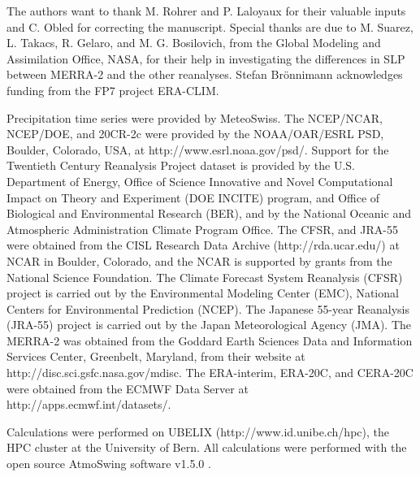 \documentclass[smallextended]{svjour3}       %
\begin{document}
	\begin{acknowledgements}
	The authors want to thank M. Rohrer and P. Laloyaux for their valuable inputs and C. Obled for correcting the manuscript. Special thanks are due to M. Suarez, L. Takacs, R. Gelaro, and M. G. Bosilovich, from the Global Modeling and Assimilation Office, NASA, for their help in investigating the differences in SLP between MERRA-2 and the other reanalyses. Stefan Br\"{o}nnimann acknowledges funding from the FP7 project ERA-CLIM.
	
	Precipitation time series were provided by MeteoSwiss. The NCEP/NCAR, NCEP/DOE, and 20CR-2c were provided by the NOAA/OAR/ESRL PSD, Boulder, Colorado, USA, at http://www.esrl.noaa.gov/psd/. Support for the Twentieth Century Reanalysis Project dataset is provided by the U.S. Department of Energy, Office of Science Innovative and Novel Computational Impact on Theory and Experiment (DOE INCITE) program, and Office of Biological and Environmental Research (BER), and by the National Oceanic and Atmospheric Administration Climate Program Office. The CFSR, and JRA-55 were obtained from the CISL Research Data Archive (http://rda.ucar.edu/) at NCAR in Boulder, Colorado, and the NCAR is supported by grants from the National Science Foundation. The Climate Forecast System Reanalysis (CFSR) project is carried out by the Environmental Modeling Center (EMC), National Centers for Environmental Prediction (NCEP). The Japanese 55-year Reanalysis (JRA-55) project is carried out by the Japan Meteorological Agency (JMA). The MERRA-2 was obtained from the Goddard Earth Sciences Data and Information Services Center, Greenbelt, Maryland, from their website at http://disc.sci.gsfc.nasa.gov/mdisc. The ERA-interim, ERA-20C, and CERA-20C were obtained from the ECMWF Data Server at http://apps.ecmwf.int/datasets/. 
	
	Calculations were performed on UBELIX (http://www.id.unibe.ch/hpc), the HPC cluster at the University of Bern. All calculations were performed with the open source AtmoSwing software v1.5.0 \citep{Horton2017a}.
	\end{acknowledgements}
	
	
	
	
	
\end{document}
